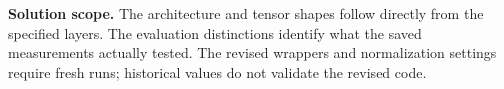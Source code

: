 \textbf{Solution scope.} The architecture and tensor shapes follow directly
from the specified layers. The evaluation distinctions identify what the
saved measurements actually tested. The revised wrappers and normalization
settings require fresh runs; historical values do not validate the revised code.

